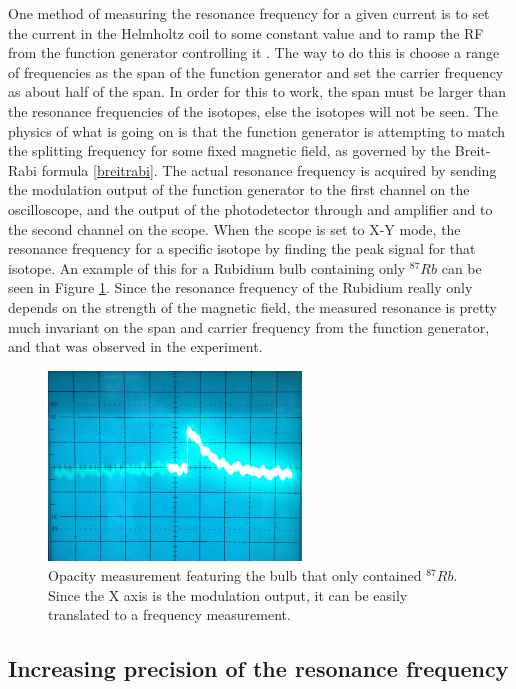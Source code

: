 \documentclass[11pt,letterpaper]{article}
\begin{document}
One method of measuring the resonance frequency for a given current is to set
the current in the Helmholtz coil to some constant value and to ramp the RF from
the function generator controlling it \cite{LabManual}. The way to do this is
choose a range of frequencies as the span of the function generator and set the
carrier frequency as about half of the span. In order for this to work, the span
must be larger than the resonance frequencies of the isotopes, else the isotopes
will not be seen. The physics of what is going on is that the function generator
is attempting to match the splitting frequency for some fixed magnetic field, as
governed by the Breit-Rabi formula \eqref{breitrabi}. The actual resonance
frequency is acquired by sending the modulation output of the function generator
to the first channel on the oscilloscope, and the output of the photodetector
through and amplifier and to the second channel on the scope. When the scope is
set to X-Y mode, the resonance frequency for a specific isotope by finding the
peak signal for that isotope. An example of this for a Rubidium bulb containing
only $^{87}Rb$ can be seen in Figure \ref{rb87opacity}. Since the resonance
frequency of the Rubidium really only depends on the strength of the magnetic
field, the measured resonance is pretty much invariant on the span and carrier
frequency from the function generator, and that was observed in the experiment.

\begin{figure}
    \centering
    \includegraphics[width=0.6\textwidth]{figures/IMG_1241.JPG}
    \caption{Opacity measurement featuring the bulb that only contained
        $^{87}Rb$. Since the X axis is the modulation output, it can be easily
        translated to a frequency measurement.}
    \label{rb87opacity}
\end{figure}

\subsection{Increasing precision of the resonance frequency}
\end{document}
